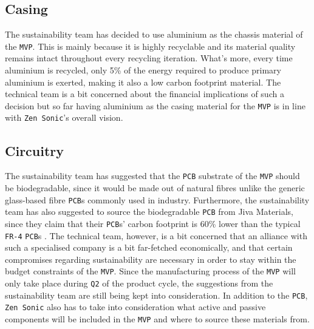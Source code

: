 \documentclass[12pt]{article}
\begin{document}
\subsection{Casing}
The sustainability team has decided to use aluminium as the chassis material of the \texttt{MVP}. This is mainly because it is highly recyclable and its material quality remains intact throughout every recycling iteration. What's more, every time aluminium is recycled, only 5\% of the energy required to produce primary aluminium is exerted, making it also a low carbon footprint material\cite{ALUM}. The technical team is a bit concerned about the financial implications of such a decision but so far having aluminium as the casing material for the \texttt{MVP} is in line with \texttt{Zen Sonic}'s overall vision.
\subsection{Circuitry}
The sustainability team has suggested that the \texttt{PCB} substrate of the \texttt{MVP} should be biodegradable, since it would be made out of natural fibres unlike the generic glass-based fibre \texttt{PCB}s commonly used in industry. Furthermore, the sustainability team has also suggested to source the biodegradable \texttt{PCB} from Jiva Materials, since they claim that their \texttt{PCB}s' carbon footprint is 60\% lower than the typical \texttt{FR-4} \texttt{PCB}s \cite{JIVA}. The technical team, however, is a bit concerned that an alliance with such a specialised company is a bit far-fetched economically, and that certain compromises regarding sustainability are necessary in order to stay within the budget constraints of the \texttt{MVP}. Since the manufacturing process of the \texttt{MVP} will only take place during \texttt{Q2} of the product cycle, the suggestions from the sustainability team are still being kept into consideration. In addition to the \texttt{PCB}, \texttt{Zen Sonic} also has to take into consideration what active and passive components will be included in the \texttt{MVP} and where to source these materials from. 
\end{document}
